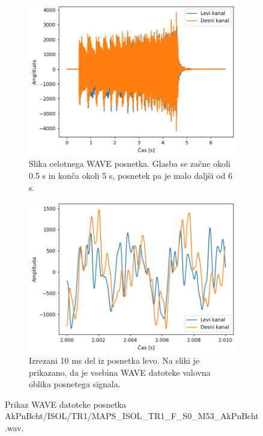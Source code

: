 \documentclass[a4paper, 12pt, openright]{book}
\begin{document}
\begin{figure}
    \centering
    \begin{subfigure}[t]{.45\textwidth}
        \centering
        \includegraphics[width=\linewidth]{wave.png}
        \caption{Slika celotnega WAVE posnetka. Glasba se začne okoli 0.5 s in konča okoli 5 s, posnetek pa je malo daljši od 6 s.}
        \label{fig:sub1}
    \end{subfigure}%
    \hspace{1em}%
    \begin{subfigure}[t]{.45\textwidth}
        \centering
        \includegraphics[width=\linewidth]{wave_zoom.png}
        \caption{Izrezani 10 ms del iz posnetka levo. Na sliki je prikazano, da je vsebina WAVE datoteke valovna oblika posnetega signala.}
        \label{fig:sub2}
    \end{subfigure}
\caption{Prikaz WAVE datoteke posnetka \\ AkPnBcht/ISOL/TR1/MAPS\_ISOL\_TR1\_F\_S0\_M53\_AkPnBcht.wav.}
\label{fig:wave}
\end{figure}
\end{document}
